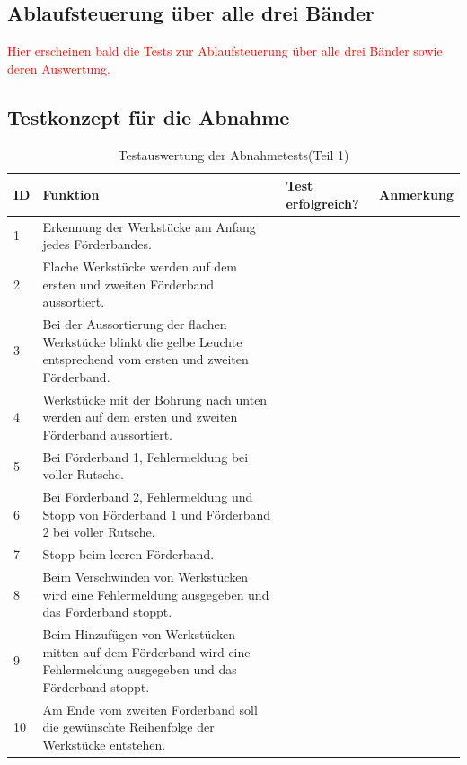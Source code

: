 \documentclass[a4paper, 11pt]{article}
\begin{document}
\subsection{Ablaufsteuerung über alle drei Bänder}
\textcolor{red}{Hier erscheinen bald die Tests zur Ablaufsteuerung über alle drei Bänder sowie deren Auswertung.}

\subsection{Testkonzept für die Abnahme} 
\begin{table}[H]
\center
    \begin{tabularx}{\textwidth}{|l|X|X|X|}
        \hline
        \textbf{ID}&\textbf{Funktion}&\textbf{Test erfolgreich?}&\textbf{Anmerkung}\\
        \hline
        1&Erkennung der Werkstücke am Anfang jedes Förderbandes.&&\\
        \hline
        2&Flache Werkstücke werden auf dem ersten und zweiten Förderband aussortiert.&&\\
        \hline
        3&Bei der Aussortierung der flachen Werkstücke blinkt die gelbe Leuchte entsprechend vom ersten und zweiten Förderband.&&\\
        \hline
        4&Werkstücke mit der Bohrung nach unten werden auf dem ersten und zweiten Förderband aussortiert.&&\\
        \hline
        5&Bei Förderband 1, Fehlermeldung bei voller Rutsche.&&\\
        \hline
        6&Bei Förderband 2, Fehlermeldung und Stopp von Förderband 1 und Förderband 2 bei voller Rutsche.&&\\
        \hline
        7&Stopp beim leeren Förderband.&&\\
        \hline
        8&Beim Verschwinden von Werkstücken wird eine Fehlermeldung ausgegeben und das Förderband stoppt.&&\\
        \hline
        9&Beim Hinzufügen von Werkstücken mitten auf dem Förderband wird eine Fehlermeldung ausgegeben und das Förderband stoppt.&&\\
        \hline
        10&Am Ende vom zweiten Förderband soll die gewünschte Reihenfolge der Werkstücke entstehen.&&\\
        \hline
    \end{tabularx}
    \caption{Testauswertung der Abnahmetests(Teil 1)}
    \label{tstl1}
\end{table}
\end{document}
